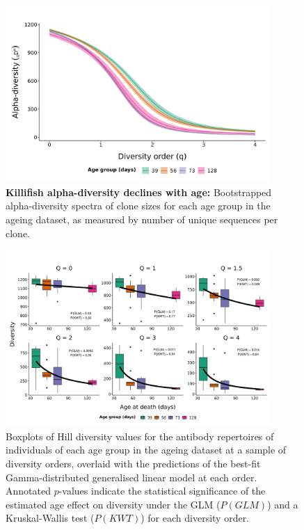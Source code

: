 \begin{figure}
\centering
\includegraphics[width = 0.9\textwidth]{_Figures/png/ageing-clone-diversity-alpha}
\caption{\textbf{Killifish alpha-diversity declines with age:} Bootstrapped alpha-diversity spectra of clone sizes for each age group in the \igseq ageing dataset, as measured by number of unique sequences per clone.}
\label{fig:igseq-ageing-clone-diversity-alpha}
\end{figure}

\begin{figure}
\centering
\includegraphics[width = 0.9\textwidth]{_Figures/png/ageing-clone-diversity-solo-fit-gamma}
\caption{Boxplots of Hill diversity values for the antibody repertoires of individuals of each age group in the \igseq ageing dataset at a sample of diversity orders, overlaid with the predictions of the best-fit Gamma-distributed generalised linear model at each order.  Annotated $p$-values indicate the statistical significance of the estimated age effect on diversity under the GLM ($P(GLM)$) and a Kruskal-Wallis test ($P(KWT)$) for each diversity order.}
\label{fig:igseq-ageing-clone-diversity-solo-fit-gamma}
\end{figure}

